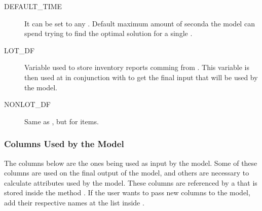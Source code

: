 \documentclass[letterpaper,10pt,english]{sphinxmanual}
\begin{document}
\begin{description}
\item[{DEFAULT\_TIME\label{\detokenize{source/optimization.configuration:term-DEFAULT_TIME}}}] \leavevmode
It can be set to any  . Default maximum amount of seconda the model can spend trying to find the optimal solution for a single .

\item[{LOT\_DF\label{\detokenize{source/optimization.configuration:term-LOT_DF}}}] \leavevmode
Variable used to store inventory reports comming from .
This variable is then used at {\hyperref[\detokenize{source/optimization.datatools:optimization.datatools.pipelines.data_pipeline}]{}}
in conjunction with  to get the final input that will be used by the model.

\item[{NONLOT\_DF\label{\detokenize{source/optimization.configuration:term-NONLOT_DF}}}] \leavevmode
Same as , but for  items.

\end{description}


\subsubsection{Columns Used by the Model}
\label{\detokenize{source/optimization.configuration:columns-used-by-the-model}}
The columns below are the ones being used as input by the model. Some of these columns are used on the final output of the model,
and others are necessary to calculate attributes used by the model. These columns are referenced by a  that is stored inside the method {\hyperref[\detokenize{source/optimization.datatools:optimization.datatools.pipelines.data_pipeline}]{}}.
If the user wants to pass new columns to the model, add their respective names at the list inside {\hyperref[\detokenize{source/optimization.datatools:optimization.datatools.pipelines.data_pipeline}]{}}.
\end{document}
